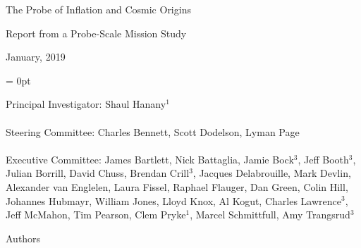 \documentclass[PICOReport.tex]{subfiles}
\begin{document}

\LARGE{ \centerline{The Probe of Inflation and Cosmic Origins}}
\vspace{0.1in}
\Large{ \centerline{Report from a Probe-Scale Mission Study}}
\Large{ \centerline{January, 2019 }}

\parindent = 0pt
\normalsize{Principal Investigator: Shaul Hanany$^1$ \\
\vspace{-7pt} \\
\normalsize{Steering Committee: Charles Bennett, Scott Dodelson, Lyman Page } \\
\vspace{-7pt} \\
\normalsize{Executive Committee: 
James Bartlett,
Nick Battaglia,
Jamie Bock$^3$, 
Jeff Booth$^3$,
Julian Borrill, 
David Chuss,
Brendan Crill$^3$, 
Jacques Delabrouille,
Mark Devlin, 
Alexander van Englelen,
Laura Fissel,
Raphael Flauger, 
Dan Green,
Colin Hill,
Johannes Hubmayr,
William Jones, 
Lloyd Knox, 
Al Kogut, 
Charles Lawrence$^3$, \\
Jeff McMahon, 
Tim Pearson,
Clem Pryke$^1$, 
Marcel Schmittfull,
Amy Trangsrud$^3$ 
}
\\


\label{authorlist}

\Large  {\centerline {Authors}}

\footnotesize {

}}
\end{document}
